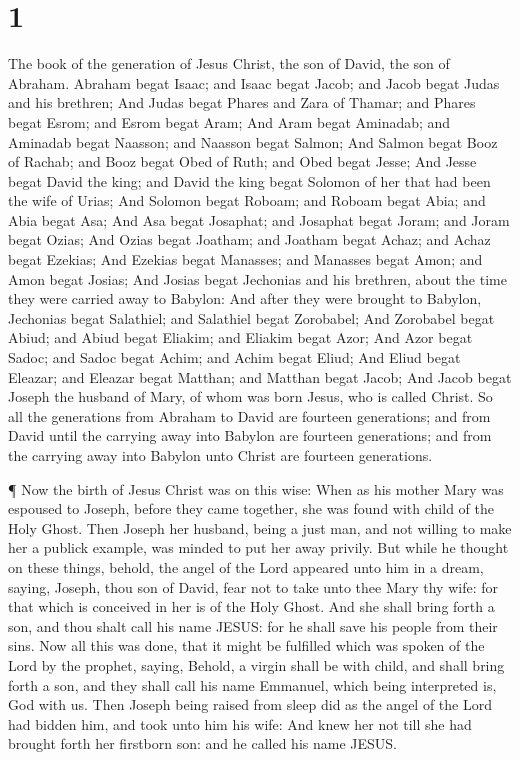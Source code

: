 \hypertarget{section}{%
\section{1}\label{section}}

 The book of the generation of Jesus Christ, the son of
David, the son of Abraham.  Abraham begat Isaac; and Isaac
begat Jacob; and Jacob begat Judas and his brethren;  And
Judas begat Phares and Zara of Thamar; and Phares begat Esrom; and Esrom
begat Aram;  And Aram begat Aminadab; and Aminadab begat
Naasson; and Naasson begat Salmon;  And Salmon begat Booz of
Rachab; and Booz begat Obed of Ruth; and Obed begat Jesse; 
And Jesse begat David the king; and David the king begat Solomon of her
that had been the wife of Urias;  And Solomon begat Roboam;
and Roboam begat Abia; and Abia begat Asa;  And Asa begat
Josaphat; and Josaphat begat Joram; and Joram begat Ozias; 
And Ozias begat Joatham; and Joatham begat Achaz; and Achaz begat
Ezekias;  And Ezekias begat Manasses; and Manasses begat
Amon; and Amon begat Josias;  And Josias begat Jechonias
and his brethren, about the time they were carried away to Babylon:
 And after they were brought to Babylon, Jechonias begat
Salathiel; and Salathiel begat Zorobabel;  And Zorobabel
begat Abiud; and Abiud begat Eliakim; and Eliakim begat Azor;
 And Azor begat Sadoc; and Sadoc begat Achim; and Achim
begat Eliud;  And Eliud begat Eleazar; and Eleazar begat
Matthan; and Matthan begat Jacob;  And Jacob begat Joseph
the husband of Mary, of whom was born Jesus, who is called Christ.
 So all the generations from Abraham to David are fourteen
generations; and from David until the carrying away into Babylon are
fourteen generations; and from the carrying away into Babylon unto
Christ are fourteen generations.

 ¶ Now the birth of Jesus Christ was on this wise: When as
his mother Mary was espoused to Joseph, before they came together, she
was found with child of the Holy Ghost.  Then Joseph her
husband, being a just man, and not willing to make her a publick
example, was minded to put her away privily.  But while he
thought on these things, behold, the angel of the Lord appeared unto him
in a dream, saying, Joseph, thou son of David, fear not to take unto
thee Mary thy wife: for that which is conceived in her is of the Holy
Ghost.  And she shall bring forth a son, and thou shalt
call his name JESUS: for he shall save his people from their sins.
 Now all this was done, that it might be fulfilled which
was spoken of the Lord by the prophet, saying,  Behold, a
virgin shall be with child, and shall bring forth a son, and they shall
call his name Emmanuel, which being interpreted is, God with us.
 Then Joseph being raised from sleep did as the angel of
the Lord had bidden him, and took unto him his wife:  And
knew her not till she had brought forth her firstborn son: and he called
his name JESUS.

